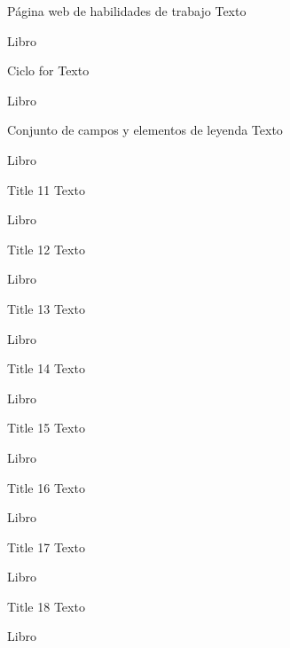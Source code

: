 \begin{frame}{Página web de habilidades de trabajo}
\justifying
Texto

{\tiny Libro}
\end{frame}

\begin{frame}{Ciclo for}
\justifying
Texto

{\tiny Libro}
\end{frame}

\begin{frame}{Conjunto de campos y elementos de leyenda}
\justifying
Texto

{\tiny Libro}
\end{frame}

\begin{frame}{Title 11}
\justifying
Texto

{\tiny Libro}
\end{frame}

\begin{frame}{Title 12}
\justifying
Texto

{\tiny Libro}
\end{frame}

\begin{frame}{Title 13}
\justifying
Texto

{\tiny Libro}
\end{frame}

\begin{frame}{Title 14}
\justifying
Texto

{\tiny Libro}
\end{frame}

\begin{frame}{Title 15}
\justifying
Texto

{\tiny Libro}
\end{frame}

\begin{frame}{Title 16}
\justifying
Texto

{\tiny Libro}
\end{frame}

\begin{frame}{Title 17}
\justifying
Texto

{\tiny Libro}
\end{frame}

\begin{frame}{Title 18}
\justifying
Texto

{\tiny Libro}
\end{frame}
